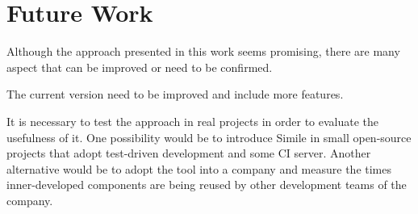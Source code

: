 \chapter{Future Work}
\label{future-work}
Although the approach presented in this work seems promising, there are many aspect that can be improved or need to be confirmed.

The current version need to be improved and include more features. 

It is necessary to test the approach in real projects in order to evaluate the usefulness of it. One possibility would be to introduce Simile in small open-source projects that adopt test-driven development and some CI server. Another alternative would be to adopt the tool into a company and measure the times inner-developed components are being reused by other development teams of the company.
